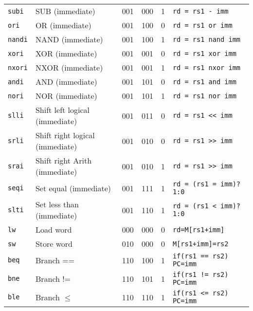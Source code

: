 \documentclass[a4paper]{article}
\begin{document}
\begin{longtable}{|l|l|c|c|c|l|}
        \texttt{subi}  & SUB (immediate)                 & 001    & 000    & 1      & \texttt{rd = rs1 - imm}       \\
        \texttt{ori}   & OR (immediate)                  & 001    & 100    & 0      & \texttt{rd = rs1 or imm}      \\
        \texttt{nandi} & NAND (immediate)                & 001    & 100    & 1      & \texttt{rd = rs1 nand imm}    \\
        \texttt{xori}  & XOR (immediate)                 & 001    & 001    & 0      & \texttt{rd = rs1 xor imm}     \\
        \texttt{nxori} & NXOR (immediate)                & 001    & 001    & 1      & \texttt{rd = rs1 nxor imm}    \\
        \texttt{andi}  & AND (immediate)                 & 001    & 101    & 0      & \texttt{rd = rs1 and imm}     \\
        \texttt{nori}  & NOR (immediate)                 & 001    & 101    & 1      & \texttt{rd = rs1 nor imm}     \\
        \texttt{slli}  & Shift left logical (immediate)  & 001    & 011    & 0      & \texttt{rd = rs1 << imm}      \\
        \texttt{srli}  & Shift right logical (immediate) & 001    & 010    & 0      & \texttt{rd = rs1 >> imm}      \\
        \texttt{srai}  & Shift right Arith (immediate)   & 001    & 010    & 1      & \texttt{rd = rs1 >> imm}      \\
        \texttt{seqi}  & Set equal (immediate)           & 001    & 111    & 1      & \texttt{rd = (rs1 = imm)?1:0} \\
        \texttt{slti}  & Set less than (immediate)       & 001    & 110    & 1      & \texttt{rd = (rs1 < imm)?1:0} \\
        \hline
        \texttt{lw}    & Load word                       & 000    & 000    & 0      & \texttt{rd=M[rs1+imm]}            \\
        \texttt{sw}    & Store word                      & 010    & 000    & 0      & \texttt{M[rs1+imm]=rs2}           \\
        \hline
        \texttt{beq}   & Branch ==                       & 110    & 100    & 1      & \texttt{if(rs1 == rs2) PC=imm}\\
        \texttt{bne}   & Branch !=                       & 110    & 101    & 1      & \texttt{if(rs1 != rs2) PC=imm}\\
        \texttt{ble}   & Branch \(\leqslant\)            & 110    & 110    & 1      & \texttt{if(rs1 <= rs2) PC=imm}\\

\end{longtable}
\end{document}

